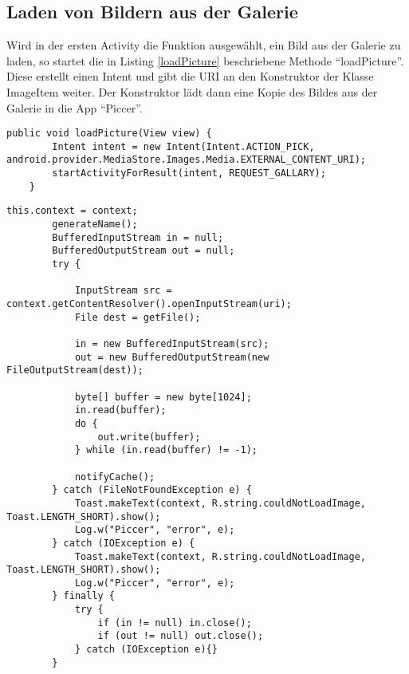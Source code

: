 \subsection{Laden von Bildern aus der Galerie}
Wird in der ersten Activity die Funktion ausgewählt, ein Bild aus der Galerie zu laden, so startet die in Listing \ref{loadPicture} beschriebene Methode \enquote{loadPicture}. Diese erstellt einen Intent und gibt die URI an den Konstruktor der Klasse ImageItem weiter. Der Konstruktor lädt dann eine Kopie des Bildes aus der Galerie in die App \enquote{Piccer}.
\begin{lstlisting}[caption={Klasse Piccer: Laden von Bildern aus der Galerie}, label=loadPicture]
    public void loadPicture(View view) {
        Intent intent = new Intent(Intent.ACTION_PICK, android.provider.MediaStore.Images.Media.EXTERNAL_CONTENT_URI);
        startActivityForResult(intent, REQUEST_GALLARY);
    }
\end{lstlisting}
\begin{lstlisting}[caption={Klasse ImageItem: Laden von Bildern aus der Galerie}, label=loadPicture2]
 this.context = context;
        generateName();
        BufferedInputStream in = null;
        BufferedOutputStream out = null;
        try {

            InputStream src = context.getContentResolver().openInputStream(uri);
            File dest = getFile();

            in = new BufferedInputStream(src);
            out = new BufferedOutputStream(new FileOutputStream(dest));

            byte[] buffer = new byte[1024];
            in.read(buffer);
            do {
                out.write(buffer);
            } while (in.read(buffer) != -1);

            notifyCache();
        } catch (FileNotFoundException e) {
            Toast.makeText(context, R.string.couldNotLoadImage, Toast.LENGTH_SHORT).show();
            Log.w("Piccer", "error", e);
        } catch (IOException e) {
            Toast.makeText(context, R.string.couldNotLoadImage, Toast.LENGTH_SHORT).show();
            Log.w("Piccer", "error", e);
        } finally {
            try {
                if (in != null) in.close();
                if (out != null) out.close();
            } catch (IOException e){}
        }
\end{lstlisting}



